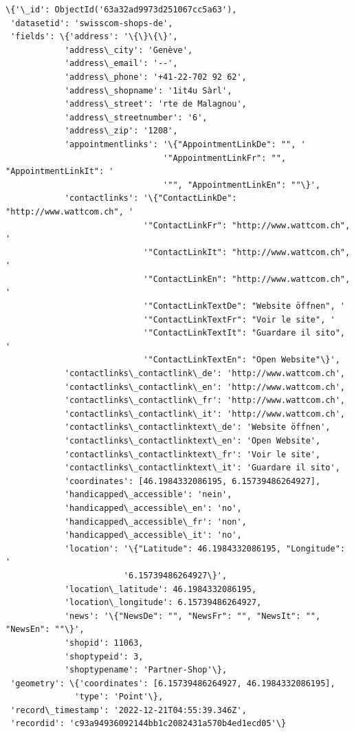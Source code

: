 \documentclass[11pt]{article}
\begin{document}
    \begin{Verbatim}[commandchars=\\\{\}]
\{'\_id': ObjectId('63a32ad9973d251067cc5a63'),
 'datasetid': 'swisscom-shops-de',
 'fields': \{'address': '\{\}\{\}',
            'address\_city': 'Genève',
            'address\_email': '--',
            'address\_phone': '+41-22-702 92 62',
            'address\_shopname': '1it4u Sàrl',
            'address\_street': 'rte de Malagnou',
            'address\_streetnumber': '6',
            'address\_zip': '1208',
            'appointmentlinks': '\{"AppointmentLinkDe": "", '
                                '"AppointmentLinkFr": "", "AppointmentLinkIt": '
                                '"", "AppointmentLinkEn": ""\}',
            'contactlinks': '\{"ContactLinkDe": "http://www.wattcom.ch", '
                            '"ContactLinkFr": "http://www.wattcom.ch", '
                            '"ContactLinkIt": "http://www.wattcom.ch", '
                            '"ContactLinkEn": "http://www.wattcom.ch", '
                            '"ContactLinkTextDe": "Website öffnen", '
                            '"ContactLinkTextFr": "Voir le site", '
                            '"ContactLinkTextIt": "Guardare il sito", '
                            '"ContactLinkTextEn": "Open Website"\}',
            'contactlinks\_contactlink\_de': 'http://www.wattcom.ch',
            'contactlinks\_contactlink\_en': 'http://www.wattcom.ch',
            'contactlinks\_contactlink\_fr': 'http://www.wattcom.ch',
            'contactlinks\_contactlink\_it': 'http://www.wattcom.ch',
            'contactlinks\_contactlinktext\_de': 'Website öffnen',
            'contactlinks\_contactlinktext\_en': 'Open Website',
            'contactlinks\_contactlinktext\_fr': 'Voir le site',
            'contactlinks\_contactlinktext\_it': 'Guardare il sito',
            'coordinates': [46.1984332086195, 6.15739486264927],
            'handicapped\_accessible': 'nein',
            'handicapped\_accessible\_en': 'no',
            'handicapped\_accessible\_fr': 'non',
            'handicapped\_accessible\_it': 'no',
            'location': '\{"Latitude": 46.1984332086195, "Longitude": '
                        '6.15739486264927\}',
            'location\_latitude': 46.1984332086195,
            'location\_longitude': 6.15739486264927,
            'news': '\{"NewsDe": "", "NewsFr": "", "NewsIt": "", "NewsEn": ""\}',
            'shopid': 11063,
            'shoptypeid': 3,
            'shoptypename': 'Partner-Shop'\},
 'geometry': \{'coordinates': [6.15739486264927, 46.1984332086195],
              'type': 'Point'\},
 'record\_timestamp': '2022-12-21T04:55:39.346Z',
 'recordid': 'c93a94936092144bb1c2082431a570b4ed1ecd05'\}
    \end{Verbatim}
\end{document}
